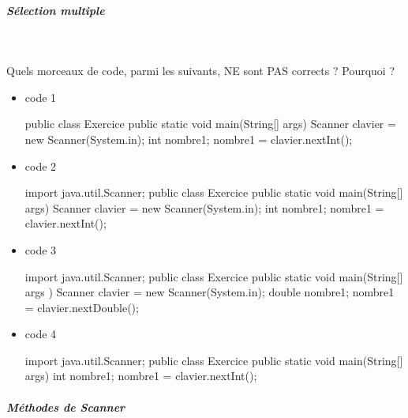 \documentclass[11pt,a4paper]{article}
\begin{document}
		\subparagraph{S\'election multiple} 
		
                \textcolor{white}{.} \par
            Quels morceaux de code, parmi les suivants, NE sont PAS corrects ? Pourquoi ?
						
            \begin{itemize} 
        
            \item[ \ding{"6F} ]  
							code 1
							\begin{Java}
    public class Exercice { 
        public static void main(String[] args) { 
            Scanner clavier = new Scanner(System.in); 
            int nombre1; 
            nombre1 = clavier.nextInt();
        } 
    }						\end{Java}
        
            \item[ \ding{"6F} ]  
							code 2
							\begin{Java}
    import java.util.Scanner;
    public class Exercice {  
        public static void main(String[] args) {
            Scanner clavier = new Scanner(System.in);
            int nombre1;
            nombre1 = clavier.nextInt();
        }  
    }						\end{Java}
        
            \item[ \ding{"6F} ]  
							code 3
							\begin{Java}
    import java.util.Scanner;
    public class Exercice {
        public static void main(String[] args ) {
            Scanner clavier = new Scanner(System.in); 
            double nombre1;  
            nombre1 = clavier.nextDouble();  
        }
    }						\end{Java}
        
            \item[ \ding{"6F} ]  
							code 4
							\begin{Java}
    import java.util.Scanner;
    public class Exercice { 
        public static void main(String[] args) {
            int nombre1;  
            nombre1 = clavier.nextInt(); 
        }
    }						\end{Java}
        
            \end{itemize} 
        
			
		\subparagraph{M\'ethodes de Scanner} 
		
\end{document}
